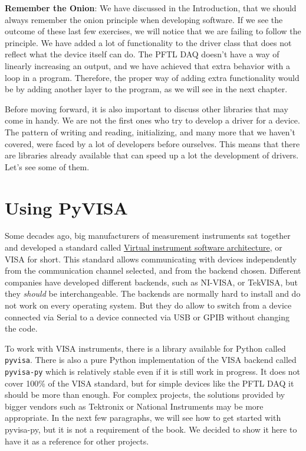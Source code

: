 \textbf{Remember the Onion}: We have discussed in the Introduction, that we should always remember the onion principle when developing software. If we see the outcome of these last few exercises, we will notice that we are failing to follow the principle. We have added a lot of functionality to the driver class that does not reflect what the device itself can do. The {PFTL DAQ} doesn't have a way of linearly increasing an output, and we have achieved that extra behavior with a loop in a program. Therefore, the proper way of adding extra functionality would be by adding another layer to the program, as we will see in the next chapter. 

Before moving forward, it is also important to discuss other libraries that may come in handy. We are not the first ones who try to develop a driver for a device. The pattern of writing and reading, initializing, and many more that we haven't covered, were faced by a lot of developers before ourselves. This means that there are libraries already available that can speed up a lot the development of drivers. Let's see some of them. 

\section{Using PyVISA}\label{section:pyvisa}
Some decades ago, big manufacturers of measurement instruments sat together and developed a standard called \href{https://en.wikipedia.org/wiki/Virtual_instrument_software_architecture}{Virtual instrument software architecture}, or VISA for short. This standard allows communicating with devices independently from the communication channel selected, and from the backend chosen. Different companies have developed different backends, such as NI-VISA, or TekVISA, but they \emph{should} be interchangeable. The backends are normally hard to install and do not work on every operating system. But they do allow to switch from a device connected via Serial to a device connected via USB or GPIB without changing the code. 

To work with VISA instruments, there is a library available for Python called \texttt{pyvisa}. There is also a pure Python implementation of the VISA backend called \texttt{pyvisa-py} which is relatively stable even if it is still work in progress. It does not cover 100\% of the VISA standard, but for simple devices like the {PFTL DAQ} it should be more than enough. For complex projects, the solutions provided by bigger vendors such as Tektronix or National Instruments may be more appropriate. In the next few paragraphs, we will see how to get started with pyvisa-py, but it is not a requirement of the book. We decided to show it here to have it as a reference for other projects.

